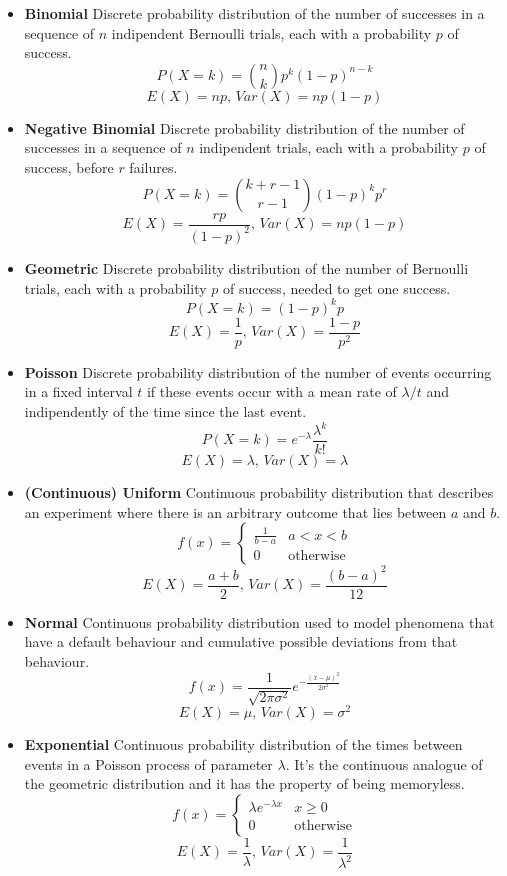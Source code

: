 \begin{itemize}[leftmargin=3ex]

\item \textbf{Binomial}
Discrete probability distribution of the number of successes in a sequence
of $n$ indipendent Bernoulli trials, each with a probability $p$ of success.
\[P(X = k) = \binom{n}{k}p^k(1 - p)^{n - k}\]
\[E(X) = np,\,Var(X) = np(1 - p)\]


\item \textbf{Negative Binomial}
Discrete probability distribution of the number of successes in a sequence
of $n$ indipendent trials, each with a probability $p$ of success,
before $r$ failures.
\[P(X = k) = \binom{k + r - 1}{r - 1}(1 - p)^kp^r\]
\[E(X) = \frac{rp}{(1 - p)^2},\,Var(X) = np(1 - p)\]


\item \textbf{Geometric}
Discrete probability distribution of the number of Bernoulli trials,
each with a probability $p$ of success, needed to get one success.
\[P(X = k) = (1 - p)^kp\]
\[E(X) = \frac{1}{p},\,Var(X) = \frac{1 - p}{p^2}\]


\item \textbf{Poisson}
Discrete probability distribution of the number of events occurring
in a fixed interval $t$ if these events occur with a mean rate of $\lambda / t$
and indipendently of the time since the last event.
\[P(X = k) = e^{-\lambda}\frac{\lambda^k}{k!}\]
\[E(X) = \lambda,\,Var(X) = \lambda\]


\item \textbf{(Continuous) Uniform}
Continuous probability distribution that describes an experiment
where there is an arbitrary outcome that lies between $a$ and $b$.
\[f(x) =
	\begin{cases}
		\frac{1}{b-a} & a < x < b \\
		0 & \textrm{otherwise}
	\end{cases}
\]
\[E(X) = \frac{a + b}{2},\,Var(X) = \frac{(b - a)^2}{12}\]


\item \textbf{Normal}
Continuous probability distribution used to model phenomena that have
a default behaviour and cumulative possible deviations from that behaviour.
\[f(x) = \frac{1}{\sqrt{2\pi\sigma^2}}e^{-\frac{(x - \mu)^2}{2\sigma^2}}\]
\[E(X) = \mu,\,Var(X) = \sigma^2\]


\item \textbf{Exponential}
Continuous probability distribution of the times between events
in a Poisson process of parameter $\lambda$.
It's the continuous analogue of the geometric distribution and
it has the property of being memoryless.
\[f(x) =
	\begin{cases}
		\lambda e^{-\lambda x} & x \ge 0 \\
		0 & \textrm{otherwise}
	\end{cases}
\]
\[E(X) = \frac{1}{\lambda},\,Var(X) = \frac{1}{\lambda^2}\]

\end{itemize}

